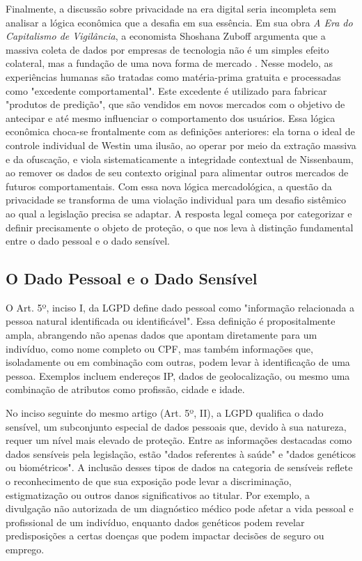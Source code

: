 Finalmente, a discussão sobre privacidade na era digital seria incompleta sem analisar a lógica econômica que a desafia em sua essência. Em sua obra \textit{A Era do Capitalismo de Vigilância}, a economista Shoshana Zuboff argumenta que a massiva coleta de dados por empresas de tecnologia não é um simples efeito colateral, mas a fundação de uma nova forma de mercado \cite{Zuboff2019}. Nesse modelo, as experiências humanas são tratadas como matéria-prima gratuita e processadas como "excedente comportamental". Este excedente é utilizado para fabricar "produtos de predição", que são vendidos em novos mercados com o objetivo de antecipar e até mesmo influenciar o comportamento dos usuários. Essa lógica econômica choca-se frontalmente com as definições anteriores: ela torna o ideal de controle individual de Westin uma ilusão, ao operar por meio da extração massiva e da ofuscação, e viola sistematicamente a integridade contextual de Nissenbaum, ao remover os dados de seu contexto original para alimentar outros mercados de futuros comportamentais. Com essa nova lógica mercadológica, a questão da privacidade se transforma de uma violação individual para um desafio sistêmico ao qual a legislação precisa se adaptar. A resposta legal começa por categorizar e definir precisamente o objeto de proteção, o que nos leva à distinção fundamental entre o dado pessoal e o dado sensível.

\subsection{O Dado Pessoal e o Dado Sensível}
\label{subsec:fund-dados-sensiveis}

O Art. 5º, inciso I, da LGPD \cite{Brasil2018lgpd} define dado pessoal como "informação relacionada a pessoa natural identificada ou identificável". Essa definição é propositalmente ampla, abrangendo não apenas dados que apontam diretamente para um indivíduo, como nome completo ou CPF, mas também informações que, isoladamente ou em combinação com outras, podem levar à identificação de uma pessoa. Exemplos incluem endereços IP, dados de geolocalização, ou mesmo uma combinação de atributos como profissão, cidade e idade.

No inciso seguinte do mesmo artigo (Art. 5º, II), a LGPD qualifica o dado sensível, um subconjunto especial de dados pessoais que, devido à sua natureza, requer um nível mais elevado de proteção. Entre as informações destacadas como dados sensíveis pela legislação, estão "dados referentes à saúde" e "dados genéticos ou biométricos". A inclusão desses tipos de dados na categoria de sensíveis reflete o reconhecimento de que sua exposição pode levar a discriminação, estigmatização ou outros danos significativos ao titular. Por exemplo, a divulgação não autorizada de um diagnóstico médico pode afetar a vida pessoal e profissional de um indivíduo, enquanto dados genéticos podem revelar predisposições a certas doenças que podem impactar decisões de seguro ou emprego.

